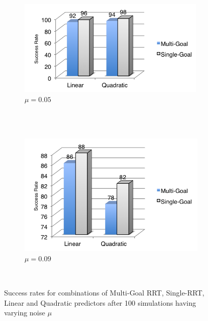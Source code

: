 \documentclass[letterpaper, 10 pt, conference]{ieeeconf}  %
\begin{document}
\begin{figure}
        \centering
        \begin{subfigure}[b]{0.5\textwidth}
                \centering
                \includegraphics[width=\textwidth]{fig/noise-005}
                \caption{$\mu = 0.05$}
                \label{fig:noise-005}
        \end{subfigure}%
        \\
        ~ %
        \begin{subfigure}[b]{0.5\textwidth}
                \centering
                \includegraphics[width=\textwidth]{fig/noise-009}
                \caption{$\mu = 0.09$}
                \label{fig:noise-009}
        \end{subfigure}
        ~ %
        \caption{Success rates for combinations of Multi-Goal RRT, Single-RRT, Linear and Quadratic predictors after 100 simulations having varying noise $\mu$}\label{fig:noise}
\end{figure}
\end{document}
